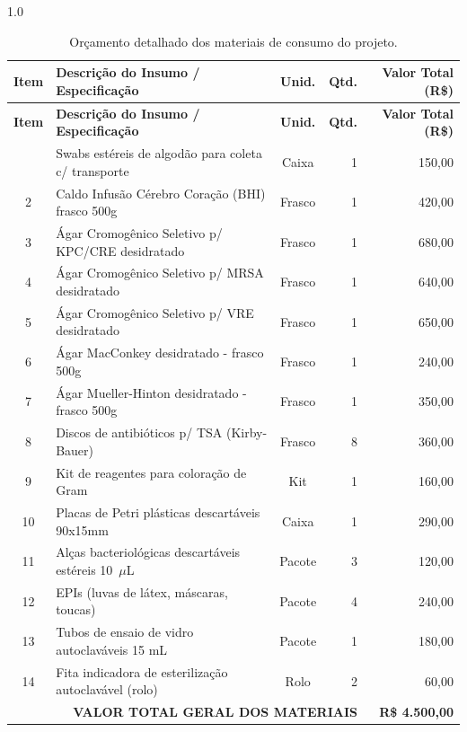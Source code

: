 \documentclass[12pt,a4paper]{article}
\begin{document}
\begin{spacing}{1.0}
\begin{longtable}{clcrr}
\caption{Orçamento detalhado dos materiais de consumo do projeto.}\\
\toprule
\textbf{Item} & \textbf{Descrição do Insumo / Especificação} & \textbf{Unid.} & \textbf{Qtd.} & \textbf{Valor Total (R\$)} \\
\midrule
\endfirsthead
\toprule
\textbf{Item} & \textbf{Descrição do Insumo / Especificação} & \textbf{Unid.} & \textbf{Qtd.} & \textbf{Valor Total (R\$)} \\
\midrule
\endhead
\bottomrule
\endfoot
1 & Swabs estéreis de algodão para coleta c/ transporte & Caixa & 1 & 150,00 \\
2 & Caldo Infusão Cérebro Coração (BHI) frasco 500g & Frasco & 1 & 420,00 \\
3 & Ágar Cromogênico Seletivo p/ KPC/CRE desidratado & Frasco & 1 & 680,00 \\
4 & Ágar Cromogênico Seletivo p/ MRSA desidratado & Frasco & 1 & 640,00 \\
5 & Ágar Cromogênico Seletivo p/ VRE desidratado & Frasco & 1 & 650,00 \\
6 & Ágar MacConkey desidratado - frasco 500g & Frasco & 1 & 240,00 \\
7 & Ágar Mueller-Hinton desidratado - frasco 500g & Frasco & 1 & 350,00 \\
8 & Discos de antibióticos p/ TSA (Kirby-Bauer) & Frasco & 8 & 360,00 \\
9 & Kit de reagentes para coloração de Gram & Kit & 1 & 160,00 \\
10 & Placas de Petri plásticas descartáveis 90x15mm & Caixa & 1 & 290,00 \\
11 & Alças bacteriológicas descartáveis estéreis 10~$\mu$L & Pacote & 3 & 120,00 \\
12 & EPIs (luvas de látex, máscaras, toucas) & Pacote & 4 & 240,00 \\
13 & Tubos de ensaio de vidro autoclaváveis 15 mL & Pacote & 1 & 180,00 \\
14 & Fita indicadora de esterilização autoclavável (rolo) & Rolo & 2 & 60,00 \\
\midrule
\multicolumn{4}{r}{\textbf{VALOR TOTAL GERAL DOS MATERIAIS}} & \textbf{R\$ 4.500,00} \\
\bottomrule
\end{longtable}
\end{spacing}
\newpage

\end{document}
